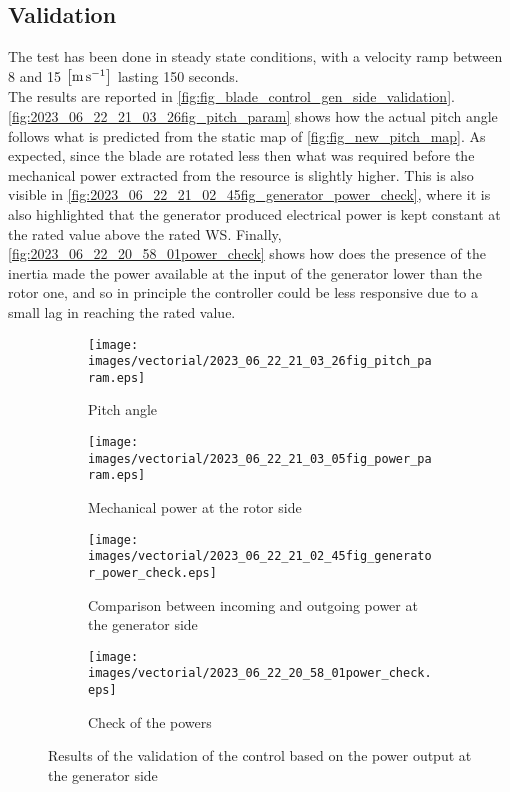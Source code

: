 \subsection{Validation}\label{subsec:validation_control_P_GE}
The test has been done in steady state conditions, with a velocity ramp between 8 and 15 $\left[\si{\meter\per\second}\right]$ lasting 150 seconds.\\
The results are reported in \autoref{fig:fig_blade_control_gen_side_validation}. \autoref{fig:2023_06_22_21_03_26fig_pitch_param} shows how the actual pitch angle follows what is predicted from the static map of \autoref{fig:fig_new_pitch_map}. As expected, since the blade are rotated less then what was required before the mechanical power extracted from the resource is slightly higher. This is also visible in \autoref{fig:2023_06_22_21_02_45fig_generator_power_check}, where it is also highlighted that the generator produced electrical power is kept constant at the rated value above the rated WS. Finally, \autoref{fig:2023_06_22_20_58_01power_check} shows how does the presence of the inertia made the power available at the input of the generator lower than the rotor one, and so in principle the controller could be less responsive due to a small lag in reaching the rated value. 
\begin{figure}[htb]
  \begin{subfigure}{0.5\textwidth}
    \centering
    \texttt{[image: images/vectorial/2023\_06\_22\_21\_03\_26fig\_pitch\_param.eps]}
    \caption{Pitch angle}
    \label{fig:2023_06_22_21_03_26fig_pitch_param}
  \end{subfigure}
  \begin{subfigure}{0.5\textwidth}
    \centering
    \texttt{[image: images/vectorial/2023\_06\_22\_21\_03\_05fig\_power\_param.eps]}
    \caption{Mechanical power at the rotor side}
    \label{fig:2023_06_22_21_03_05fig_power_param}
  \end{subfigure}
  \begin{subfigure}{0.5\textwidth}
    \centering
    \texttt{[image: images/vectorial/2023\_06\_22\_21\_02\_45fig\_generator\_power\_check.eps]}
    \caption{Comparison between incoming and outgoing power at the generator side}
    \label{fig:2023_06_22_21_02_45fig_generator_power_check}
  \end{subfigure}
  \begin{subfigure}{0.5\textwidth}
    \centering
    \texttt{[image: images/vectorial/2023\_06\_22\_20\_58\_01power\_check.eps]}
    \caption{Check of the powers}
    \label{fig:2023_06_22_20_58_01power_check}
  \end{subfigure}

  \caption{Results of the validation of the control based on the power output at the generator side}
  \label{fig:fig_blade_control_gen_side_validation}
\end{figure}